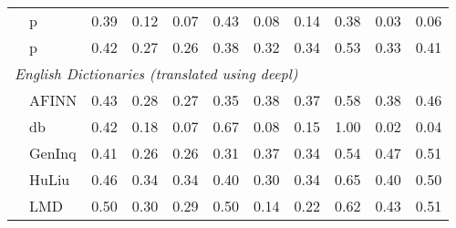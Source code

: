 \begin{table}
\begin{tabularx}{\textwidth}{lXXrrrrrrrrr}
 & \multicolumn{2}{l}{ p }& \cellcolor[gray]{0.81} 0.39& \cellcolor[gray]{0.94} 0.12& \cellcolor[gray]{0.97} 0.07& \cellcolor[gray]{0.79} 0.43& \cellcolor[gray]{0.96} 0.08& \cellcolor[gray]{0.93} 0.14& \cellcolor[gray]{0.81} 0.38& \cellcolor[gray]{0.98} 0.03& \cellcolor[gray]{0.97} 0.06\\

 & \multicolumn{2}{l}{ p }& \cellcolor[gray]{0.79} 0.42& \cellcolor[gray]{0.87} 0.27& \cellcolor[gray]{0.87} 0.26& \cellcolor[gray]{0.81} 0.38& \cellcolor[gray]{0.84} 0.32& \cellcolor[gray]{0.83} 0.34& \cellcolor[gray]{0.73} 0.53& \cellcolor[gray]{0.83} 0.33& \cellcolor[gray]{0.80} 0.41\\


\multicolumn{11}{l}{\emph{ English Dictionaries (translated using deepl) }} \\

 & \multicolumn{2}{l}{ AFINN }& \cellcolor[gray]{0.79} 0.43& \cellcolor[gray]{0.86} 0.28& \cellcolor[gray]{0.86} 0.27& \cellcolor[gray]{0.82} 0.35& \cellcolor[gray]{0.81} 0.38& \cellcolor[gray]{0.82} 0.37& \cellcolor[gray]{0.71} 0.58& \cellcolor[gray]{0.81} 0.38& \cellcolor[gray]{0.77} 0.46\\

 & \multicolumn{2}{l}{ db }& \cellcolor[gray]{0.79} 0.42& \cellcolor[gray]{0.91} 0.18& \cellcolor[gray]{0.96} 0.07& \cellcolor[gray]{0.67} 0.67& \cellcolor[gray]{0.96} 0.08& \cellcolor[gray]{0.93} 0.15& \cellcolor[gray]{0.50} 1.00& \cellcolor[gray]{0.99} 0.02& \cellcolor[gray]{0.98} 0.04\\

 & \multicolumn{2}{l}{ GenInq }& \cellcolor[gray]{0.80} 0.41& \cellcolor[gray]{0.87} 0.26& \cellcolor[gray]{0.87} 0.26& \cellcolor[gray]{0.84} 0.31& \cellcolor[gray]{0.82} 0.37& \cellcolor[gray]{0.83} 0.34& \cellcolor[gray]{0.73} 0.54& \cellcolor[gray]{0.76} 0.47& \cellcolor[gray]{0.75} 0.51\\

 & \multicolumn{2}{l}{ HuLiu }& \cellcolor[gray]{0.77} 0.46& \cellcolor[gray]{0.83} 0.34& \cellcolor[gray]{0.83} 0.34& \cellcolor[gray]{0.80} 0.40& \cellcolor[gray]{0.85} 0.30& \cellcolor[gray]{0.83} 0.34& \cellcolor[gray]{0.68} 0.65& \cellcolor[gray]{0.80} 0.40& \cellcolor[gray]{0.75} 0.50\\

 & \multicolumn{2}{l}{ LMD }& \cellcolor[gray]{0.75} 0.50& \cellcolor[gray]{0.85} 0.30& \cellcolor[gray]{0.85} 0.29& \cellcolor[gray]{0.75} 0.50& \cellcolor[gray]{0.93} 0.14& \cellcolor[gray]{0.89} 0.22& \cellcolor[gray]{0.69} 0.62& \cellcolor[gray]{0.78} 0.43& \cellcolor[gray]{0.74} 0.51\\


\end{tabularx}
\end{table}
